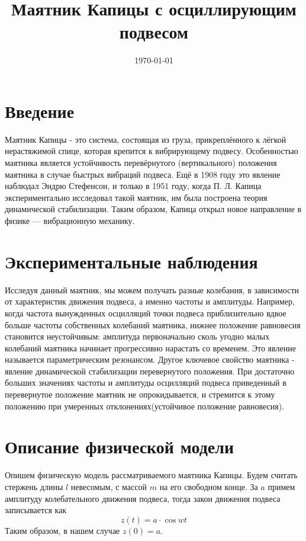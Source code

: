 \documentclass[a4paper,12pt]{article}
\title{Маятник Капицы с осциллирующим подвесом}
\date{\today}
\begin{document}

\maketitle
\newpage

\section{Введение}
	Маятник Капицы - это система, состоящая из груза, прикреплённого к лёгкой нерастяжимой спице, которая крепится к вибрирующему подвесу. Особенностью маятника является устойчивость перевёрнутого (вертикального) положения маятника в случае быстрых вибраций подвеса. Ещё в 1908 году это явление наблюдал Эндрю Стефенсон, и только в 1951 году, когда П. Л. Капица экспериментально исследовал такой маятник, им была построена теория динамической стабилизации. Таким образом, Капица открыл новое направление в физике — вибрационную механику.

\section{Экспериментальные наблюдения}
	Исследуя данный маятник, мы можем получать разные колебания, в зависимости от характеристик движения подвеса, а именно частоты и амплитуды. Например, когда частота вынужденных осцилляций точки подвеса приблизительно вдвое больше частоты собственных колебаний маятника, нижнее положение равновесия становится неустойчивым: амплитуда первоначально сколь угодно малых колебаний маятника начинает прогрессивно нарастать со временем. Это явление называется параметрическим резонансом.
Другое ключевое свойство маятника - явление динамической стабилизации перевернутого положения. При достаточно больших значениях частоты и амплитуды осцилляций подвеса приведенный в перевернутое положение маятник не опрокидывается, и стремится к этому положению при умеренных отклонениях(устойчивое положение равновесия).

\section{Описание физической модели}
	Опишем физическую модель рассматриваемого маятника Капицы. Будем считать стержень длины $l$ невесомым, с массой $m$ на его свободном конце. За $a$ примем амплитуду колебательного движения подвеса, тогда закон движения подвеса записывается как 
\begin{equation}
\label{z(t)}
z(t) = a \cdot \cos{wt}
\end{equation}
Таким образом, в нашем случае $z(0) = a$.
\end{document}
